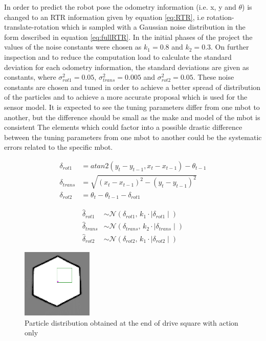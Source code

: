 \documentclass[journal,twocolumn]{IEEEtran}
\begin{document}
In order to predict the robot pose the odometry information (i.e. x, y and $\theta$) is changed to an RTR information given by equation \ref{eq:RTR}, i.e rotation-translate-rotation which is sampled with a Gaussian noise distribution in the form described in equation \ref{eq:fullRTR}. In the initial phases of the project the values of the noise constants were chosen as $k_1 = 0.8$ and $k_2 = 0.3$. On further inspection and to reduce the computation load to calculate the standard deviation for each odometry information, the standard deviations are given as constants, where ${\sigma}^2_{rot1} = 0.05$, ${\sigma}^2_{trans} = 0.005$ and ${\sigma}^2_{rot2} = 0.05$. These noise constants are chosen and tuned in order to achieve a better spread of distribution of the particles and to achieve a more accurate proposal which is used for the sensor model. It is expected to see the tuning parameters differ from one mbot to another, but the difference should be small as the make and model of the mbot is consistent The elements which could factor into a possible drastic difference between the tuning parameters from one mbot to another could be the systematic errors related to the specific mbot.

\begin{equation}\label{eq:RTR}
\begin{split}
	\delta_{rot1} &= atan2(y_t - y_{t-1}, x_t - x_{t-1}) - \theta_{t-1}	\\
	\delta_{trans} &= \sqrt{(x_t - x_{t-1})^2 - 	(y_t - y_{t-1})^2}	\\
	\delta_{rot2} &= \theta_t - \theta_{t-1} - \delta_{rot1}
\end{split}
\end{equation}

\begin{equation}\label{eq:fullRTR}
\begin{split}
	\hat{\delta}_{rot1} & \sim \mathcal{N}(\delta_{rot1},\,k_1 \cdot \mid\delta_{rot1}\mid)	\\
	\hat{\delta}_{trans} &\sim \mathcal{N}(\delta_{trans},\,k_2 \cdot \mid\delta_{trans}\mid)	\\
	\hat{\delta}_{rot2} &\sim \mathcal{N}(\delta_{rot2},\,k_1 \cdot \mid\delta_{rot2}\mid)
\end{split}
\end{equation}

\begin{figure}[H]
\centering
\includegraphics[width=0.3\textwidth]{Media/1211.png}
\caption{Particle distribution obtained at the end of drive square with action only}
\end{figure}
\end{document}
